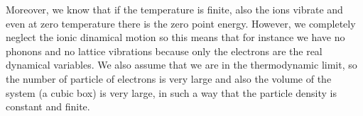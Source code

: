 \documentclass[../main/main.tex]{subfiles}
\begin{document}
\begin{figure}[h!]
\begin{minipage}[c]{0.5\linewidth}
\end{minipage}
\begin{minipage}[]{0.5\linewidth}
\centering
{}
\end{minipage}
\caption{\label{fig:} }
\end{figure}

Moreover, we know that if the temperature is finite, also the ions vibrate and even at zero temperature there is the zero point energy.
However, we completely neglect the ionic dinamical motion so this means that for instance we have no phonons and no lattice vibrations because only the electrons are the real dynamical variables.
We also assume that we are in the thermodynamic limit, so the number of particle of electrons is very large and also the volume of the system (a cubic box) is very large, in such a way that the particle density is constant and finite.
\end{document}
